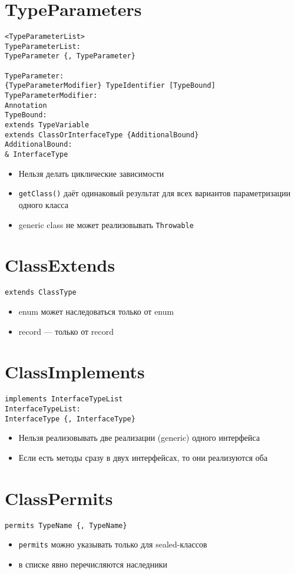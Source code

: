 \documentclass[a4paper,12pt]{article}
\begin{document}
\section*{TypeParameters}
\begin{verbatim}
<TypeParameterList>
TypeParameterList:
TypeParameter {, TypeParameter}

TypeParameter:
{TypeParameterModifier} TypeIdentifier [TypeBound]
TypeParameterModifier:
Annotation
TypeBound:
extends TypeVariable
extends ClassOrInterfaceType {AdditionalBound}
AdditionalBound:
& InterfaceType
\end{verbatim}

\begin{itemize}
  \item Нельзя делать циклические зависимости
  \item \texttt{getClass()} даёт одинаковый результат для всех вариантов параметризации одного класса
  \item generic class не может реализовывать \texttt{Throwable}
\end{itemize}

\section*{ClassExtends}
\begin{verbatim}
extends ClassType
\end{verbatim}
\begin{itemize}
  \item enum может наследоваться только от enum
  \item record — только от record
\end{itemize}

\section*{ClassImplements}
\begin{verbatim}
implements InterfaceTypeList
InterfaceTypeList:
InterfaceType {, InterfaceType}
\end{verbatim}

\begin{itemize}
  \item Нельзя реализовывать две реализации (generic) одного интерфейса
  \item Если есть методы сразу в двух интерфейсах, то они реализуются оба
\end{itemize}

\section*{ClassPermits}
\begin{verbatim}
permits TypeName {, TypeName}
\end{verbatim}
\begin{itemize}
  \item \texttt{permits} можно указывать только для sealed-классов
  \item в списке явно перечисляются наследники
\end{itemize}
\end{document}
